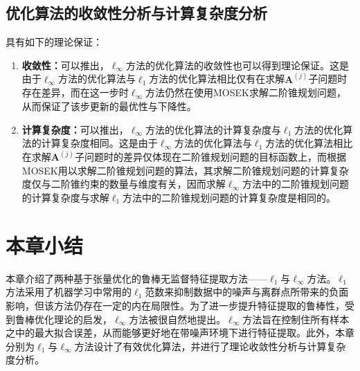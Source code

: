 \subsection{优化算法的收敛性分析与计算复杂度分析}
具有如下的理论保证：
\begin{enumerate}
    \item \textbf{收敛性：}可以推出，$\ell_{\infty}$方法的优化算法的收敛性也可以得到理论保证。这是由于$\ell_{\infty}$方法的优化算法与$\ell_{1}$方法的优化算法相比仅有在求解$\boldsymbol{A}^{(j)}$子问题时存在差异，而在这一步时$\ell_{\infty}$方法仍然在使用MOSEK求解二阶锥规划问题，从而保证了该步更新的最优性与下降性。
    \item \textbf{计算复杂度：}可以推出，$\ell_{\infty}$方法的优化算法的计算复杂度与$\ell_{1}$方法的优化算法的计算复杂度相同。这是由于$\ell_{\infty}$方法的优化算法与$\ell_{1}$方法的优化算法相比在求解$\boldsymbol{A}^{(j)}$子问题时的差异仅体现在二阶锥规划问题的目标函数上，而根据MOSEK用以求解二阶锥规划问题的算法，其求解二阶锥规划问题的计算复杂度仅与二阶锥约束的数量与维度有关，因而求解$\ell_{\infty}$方法中的二阶锥规划问题的计算复杂度与求解$\ell_{1}$方法中的二阶锥规划问题的计算复杂度是相同的。
\end{enumerate}



\section{本章小结}
本章介绍了两种基于张量优化的鲁棒无监督特征提取方法——$\ell_{1}$与$\ell_{\infty}$方法。$\ell_{1}$方法采用了机器学习中常用的$\ell_{1}$范数来抑制数据中的噪声与离群点所带来的负面影响，但该方法仍存在一定的内在局限性。为了进一步提升特征提取的鲁棒性，受到鲁棒优化理论的启发，$\ell_{\infty}$方法被很自然地提出。$\ell_{\infty}$方法旨在控制住所有样本之中的最大拟合误差，从而能够更好地在带噪声环境下进行特征提取。此外，本章分别为$\ell_{1}$与$\ell_{\infty}$方法设计了有效优化算法，并进行了理论收敛性分析与计算复杂度分析。
